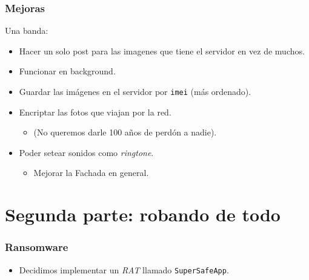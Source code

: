 \documentclass[ignorenonframetext,]{beamer}
\begin{document}
\begin{frame}\frametitle{Mejoras}
	Una banda:
	\begin{itemize}[<+->]
		\item Hacer un solo post para las imagenes que tiene el servidor en vez de muchos.
		\item Funcionar en background.
		\item Guardar las imágenes en el servidor por \texttt{imei} (más ordenado).
		\item Encriptar las fotos que viajan por la red.
		\begin{itemize}[<+->]
			\item (No queremos darle 100 años de perdón a nadie).
		\end{itemize}
		\item Poder setear sonidos como \emph{ringtone}.
		\begin{itemize}
			\item Mejorar la Fachada en general.
		\end{itemize}
	\end{itemize}
\end{frame}

\section{Segunda parte: robando de todo}
\begin{frame}\frametitle{Ransomware}
	\begin{itemize}[<+->]
		\item Decidimos implementar un \emph{RAT} llamado \texttt{SuperSafeApp}.
	\end{itemize}
\end{frame}
\end{document}
